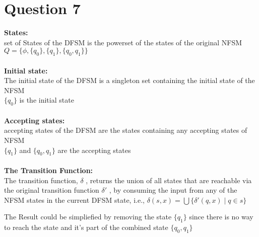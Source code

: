 \documentclass[11pt]{article}
\begin{document}
\section*{Question 7}
\textbf{States:} \\
set of States of the DFSM is the powerset of the states of the original NFSM \\
$Q = \{\phi, \{q_0\}, \{q_1\}, \{q_0, q_1\}\}$ \\
\\
\textbf{Initial state:} \\
The initial state of the DFSM is a singleton set containing the initial state of the NFSM \\
$\{q_0\}$ is the initial state \\
\\
\textbf{Accepting states:} \\
accepting states of the DFSM are the states containing any accepting states of NFSM \\
$\{q_1\}$ and $\{q_0, q_1\}$ are the accepting states \\
\\
\textbf{The Transition Function:} \\
The transition function, $\delta$ , returns the union of all states that are
reachable via the original transition function $\delta'$ , by consuming the
input from any of the NFSM states in the current DFSM state, i.e.,
$\delta(s, x) = \bigcup \{ \delta'(q, x) \mid q \in s \}$

The Result could be simpliefied by removing the state $\{q_1\}$ since there is no way
to reach the state and it's part of the combined state $\{q_0, q_1\}$

\end{document}
